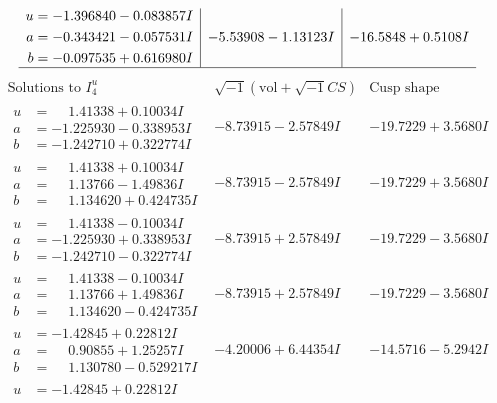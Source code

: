 \documentclass[1p]{elsarticle_modified}
\theoremstyle{definition}
\newcommand{\I}{\sqrt{-1}}
\begin{document}
$$\begin{array}{c|c|c}
\begin{aligned}
u &= -1.396840 - 0.083857 I \\
a &= -0.343421 - 0.057531 I \\
b &= -0.097535 + 0.616980 I\end{aligned}
 & -5.53908 - 1.13123 I & -16.5848 + 0.5108 I\\
 \hline 
 \end{array}$$\newpage$$\begin{array}{c|c|c}  
\text{Solutions to }I^u_{4}& \I (\text{vol} + \sqrt{-1}CS) & \text{Cusp shape}\\
 \hline 
\begin{aligned}
u &= \phantom{-}1.41338 + 0.10034 I \\
a &= -1.225930 - 0.338953 I \\
b &= -1.242710 + 0.322774 I\end{aligned}
 & -8.73915 - 2.57849 I & -19.7229 + 3.5680 I \\ \hline\begin{aligned}
u &= \phantom{-}1.41338 + 0.10034 I \\
a &= \phantom{-}1.13766 - 1.49836 I \\
b &= \phantom{-}1.134620 + 0.424735 I\end{aligned}
 & -8.73915 - 2.57849 I & -19.7229 + 3.5680 I \\ \hline\begin{aligned}
u &= \phantom{-}1.41338 - 0.10034 I \\
a &= -1.225930 + 0.338953 I \\
b &= -1.242710 - 0.322774 I\end{aligned}
 & -8.73915 + 2.57849 I & -19.7229 - 3.5680 I \\ \hline\begin{aligned}
u &= \phantom{-}1.41338 - 0.10034 I \\
a &= \phantom{-}1.13766 + 1.49836 I \\
b &= \phantom{-}1.134620 - 0.424735 I\end{aligned}
 & -8.73915 + 2.57849 I & -19.7229 - 3.5680 I \\ \hline\begin{aligned}
u &= -1.42845 + 0.22812 I \\
a &= \phantom{-}0.90855 + 1.25257 I \\
b &= \phantom{-}1.130780 - 0.529217 I\end{aligned}
 & -4.20006 + 6.44354 I & -14.5716 - 5.2942 I \\ \hline\begin{aligned}
u &= -1.42845 + 0.22812 I \\

\end{aligned}
\end{array}$$
\end{document}
